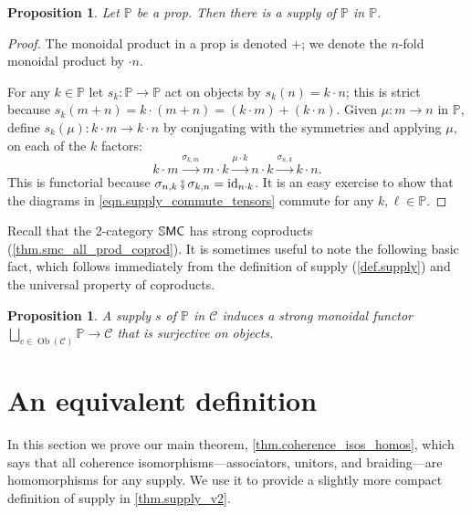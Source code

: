 \documentclass[11pt, oneside, article]{memoir}
\theoremstyle{plain}
\newtheorem{proposition}[theorem]{Proposition}
\theoremstyle{definition}
\theoremstyle{remark}
\newcommand{\Set}[1]{\mathrm{#1}}%
\newcommand{\cat}[1]{\mathcal{#1}}%
\newcommand{\Cat}[1]{{\mathsf{#1}}}%
\newcommand{\CCat}[1]{\mathbb{\StrLeft{#1}{1}}\Cat{\StrGobbleLeft{#1}{1}}}%
\DeclareMathOperator{\ob}{\Set{Ob}}
\DeclareMathOperator{\id}{id}
\newcommand{\ssmc}{\CCat{SMC}}
\newcommand{\pp}{\mathbb{P}}
\newcommand{\cp}{\mathbin{\fatsemi}}
\newcommand{\To}[1]{\xrightarrow{#1}}
\begin{document}
\begin{proposition}\label{prop.p_supplies_itself}
Let $\pp$ be a prop. Then there is a supply of $\pp$ in $\pp$.
\end{proposition}
\begin{proof}
The monoidal product in a prop is denoted $+$; we denote the $n$-fold monoidal product by $\cdot n$.

For any $k\in\pp$ let $s_k\colon\pp\to\pp$ act on objects by $s_k(n)=k\cdot n$; this is strict because $s_k(m+n)=k\cdot(m+n)=(k\cdot m)+(k\cdot n)$. Given $\mu\colon m\to n$ in $\pp$, define $s_k(\mu)\colon k\cdot m\to k\cdot n$ by conjugating with the symmetries and applying $\mu$, on each of the $k$ factors:
\begin{equation}\label{eqn.conjugation}
	k\cdot m\To{\sigma_{k,m}}
	m\cdot k\To{\mu\cdot k}
	n\cdot k\To{\sigma_{n,k}}
	k\cdot n.
\end{equation}
This is functorial because $\sigma_{n,k}\cp\sigma_{k,n}=\id_{n\cdot k}$. It is an easy exercise to show that the diagrams in \cref{eqn.supply_commute_tensors} commute for any $k,\ell\in\pp$.
\end{proof}

Recall that the 2-category $\ssmc$ has strong coproducts (\cref{thm.smc_all_prod_coprod}). It is sometimes useful to note the following basic fact, which follows immediately from the definition of supply (\cref{def.supply}) and the universal property of coproducts.

\begin{proposition}
A supply $s$ of $\pp$ in $\cat{C}$ induces a strong monoidal functor $\bigsqcup_{c\in\ob(\cat{C})}\pp\to\cat{C}$ that is surjective on objects.
\end{proposition}

\section{An equivalent definition}\label{sec.main_thm}

In this section we prove our main theorem, \cref{thm.coherence_isos_homos}, which says that all coherence isomorphisms---associators, unitors, and braiding---are homomorphisms for any supply. We use it to provide a slightly more compact definition of supply in \cref{thm.supply_v2}.
\end{document}
